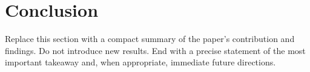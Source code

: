 \section{Conclusion}
\label{sec:conclusion}

Replace this section with a compact summary of the paper's contribution and findings. Do not introduce new results. End with a precise statement of the most important takeaway and, when appropriate, immediate future directions.
